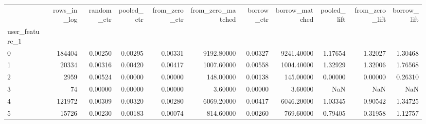\begin{tabular}{lrrrrrrrrrr}
\toprule
 & rows\_in\_log & random\_ctr & pooled\_ctr & from\_zero\_ctr & from\_zero\_matched & borrow\_ctr & borrow\_matched & pooled\_lift & from\_zero\_lift & borrow\_lift \\
user\_feature\_1 &  &  &  &  &  &  &  &  &  &  \\
\midrule
0 & 184404 & 0.00250 & 0.00295 & 0.00331 & 9192.80000 & 0.00327 & 9241.40000 & 1.17654 & 1.32027 & 1.30468 \\
1 & 20334 & 0.00316 & 0.00420 & 0.00417 & 1007.60000 & 0.00558 & 1004.40000 & 1.32929 & 1.32006 & 1.76568 \\
2 & 2959 & 0.00524 & 0.00000 & 0.00000 & 148.00000 & 0.00138 & 145.00000 & 0.00000 & 0.00000 & 0.26310 \\
3 & 74 & 0.00000 & 0.00000 & 0.00000 & 3.60000 & 0.00000 & 3.60000 & NaN & NaN & NaN \\
4 & 121972 & 0.00309 & 0.00320 & 0.00280 & 6069.20000 & 0.00417 & 6046.20000 & 1.03345 & 0.90542 & 1.34725 \\
5 & 15726 & 0.00230 & 0.00183 & 0.00074 & 814.60000 & 0.00260 & 769.60000 & 0.79405 & 0.31958 & 1.12757 \\
\bottomrule
\end{tabular}

